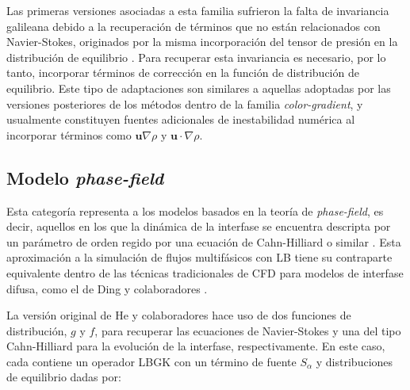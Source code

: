 Las primeras versiones asociadas a esta familia sufrieron la falta de invariancia galileana debido a la recuperaci\'on de t\'erminos que no est\'an relacionados con Navier-Stokes, originados por la misma incorporaci\'on del tensor de presi\'on en la distribuci\'on de equilibrio \cite{kuzmin_multi-relaxation_2008}. Para recuperar esta invariancia es necesario, por lo tanto, incorporar t\'erminos de correcci\'on en la funci\'on de distribuci\'on de equilibrio. Este tipo de adaptaciones son similares a aquellas adoptadas por las versiones posteriores de los m\'etodos dentro de la familia \emph{color-gradient}, y usualmente constituyen fuentes adicionales de inestabilidad num\'erica al incorporar t\'erminos como $\bm{u}\nabla\rho$ y $\bm{u}\cdot\nabla\rho$.


\subsection{Modelo \emph{phase-field}}
Esta categor\'ia representa a los modelos basados en la teor\'ia de \emph{phase-field}, es decir, aquellos en los que la din\'amica de la interfase se encuentra descripta por un par\'ametro de orden regido por una ecuaci\'on de Cahn-Hilliard o similar \cite{jacqmin_calculation_1999}. Esta aproximaci\'on a la simulaci\'on de flujos multif\'asicos con LB tiene su contraparte equivalente dentro de las t\'ecnicas tradicionales de CFD para modelos de interfase difusa, como el de Ding y colaboradores \cite{ding_diffuse_2007}.

La versi\'on original de He y colaboradores \cite{he_lattice_1999} hace uso de dos funciones de distribuci\'on, $g$ y $f$, para recuperar las ecuaciones de Navier-Stokes y una del tipo Cahn-Hilliard para la evoluci\'on de la interfase, respectivamente. En este caso, cada \lbe{} contiene un operador LBGK con un t\'ermino de fuente $S_{\alpha}$ y distribuciones de equilibrio dadas por:

